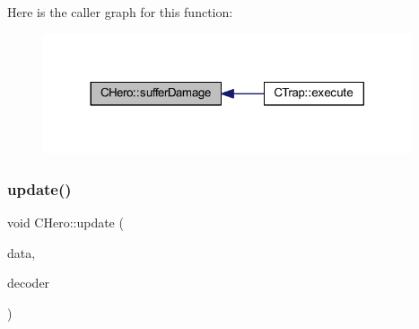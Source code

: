 Here is the caller graph for this function\+:\nopagebreak
\begin{figure}[H]
\begin{center}
\leavevmode
\includegraphics[width=308pt]{class_c_hero_a9442ae76d634a968c99d6bc77c927f96_icgraph}
\end{center}
\end{figure}
\mbox{\label{class_c_hero_a7b1a1b3c196bbe5b8da97c56f520c1f3}} 
\subsubsection{\texorpdfstring{update()}{update()}}
{\footnotesize\ttfamily void C\+Hero\+::update (\begin{DoxyParamCaption}\item[{const std\+::string \&}]{data,  }\item[{const \mbox{\hyperlink{class_c_stream_decoder}{C\+Stream\+Decoder}} \&}]{decoder }\end{DoxyParamCaption})}

